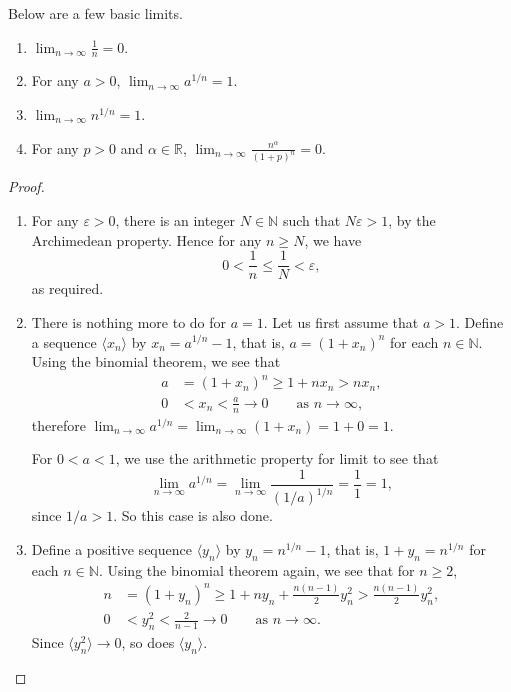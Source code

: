 Below are a few basic limits.
\begin{thm}
  \begin{enumerate}[$(1)$]
    \item $\displaystyle\lim_{n\to\infty} \frac{1}{n} = 0$.
    \item For any $a > 0$, $\displaystyle \lim_{n\to\infty} a^{1/n} = 1$.
    \item $\displaystyle \lim_{n\to\infty} n^{1/n} = 1$.
    \item For any $p > 0$ and $\alpha \in \mathbb{R}$, $\displaystyle \lim_{n\to\infty} \frac{n^\alpha}{(1+p)^n} = 0$.
  \end{enumerate}
\end{thm}

\begin{proof}
  \begin{enumerate}[(1)]
    \item For any $\varepsilon > 0$, there is an integer $N \in \mathbb{N}$ such that $N \varepsilon > 1$, by the Archimedean property.
      Hence for any $n \geqslant N$, we have
      \[
	0 < \frac{1}{n} \leqslant \frac{1}{N} < \varepsilon,
      \]
      as required.
    \item There is nothing more to do for $a = 1$.
      Let us first assume that $a > 1$.
      Define a sequence $\langle x_n \rangle$ by $x_n = a^{1/n} - 1$, that is, $a = (1 + x_n)^n$ for each $n \in \mathbb{N}$.
      Using the binomial theorem, we see that
      \begin{align*}
	a &= (1 + x_n)^n \geqslant 1 + n x_n > n x_n, \\
	0 &< x_n < \frac{a}{n} \to 0 \qquad \text{as $n \to \infty$},
      \end{align*}
      therefore $\displaystyle \lim_{n \to \infty} a^{1/n} = \lim_{n \to \infty} (1 + x_n) = 1 + 0 = 1$.

      For $0 < a < 1$, we use the arithmetic property for limit to see that
      \[
	\lim_{n \to \infty} a^{1/n} = \lim_{n\to\infty} \frac{1}{(1/a)^{1/n}} = \frac{1}{1} = 1,
      \]
      since $1/a > 1$.  
      So this case is also done.

    \item Define a positive sequence $\langle y_n \rangle$ by $y_n = n^{1/n} - 1$, that is, $1 + y_n = n^{1/n}$ for each $n \in \mathbb{N}$.  Using the binomial theorem again, we see that for $n \geqslant 2$,
      \begin{align*}
	n &= (1 + y_n)^n \geqslant 1 + n y_n + \frac{n(n-1)}{2} y_n^2 > \frac{n(n-1)}{2} y_n^2, \\
	0 &< y_n^2 < \frac{2}{n-1} \to 0 \qquad \text{as $n \to \infty$}.
\end{align*}
	Since $\langle y_n^2 \rangle \to 0$, so does $\langle y_n \rangle$.


\end{enumerate}
\end{proof}
